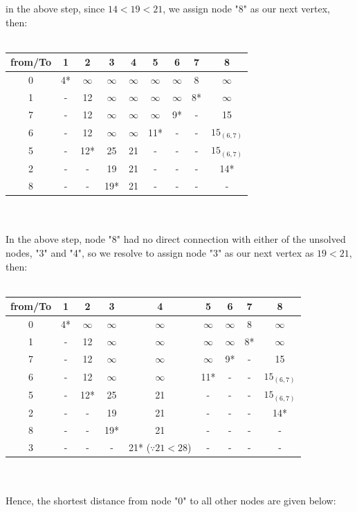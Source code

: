 in the above step, since $ 14 < 19 < 21 $, we assign node "8" as our next vertex, then:\\\\
\begin{tabular}{c | c| c| c| c| c| c| c| c}
	from/To & 1 & 2 & 3 & 4 & 5 & 6 & 7 & 8 \\
	\hline
	0 & 4* & $\infty$ & $\infty$& $\infty$& $\infty$& $\infty$ & 8 & $\infty$\\
	1 & - & 12 & $\infty$& $\infty$& $\infty$& $\infty$ & 8* & $\infty$\\
	7 & - & 12 & $\infty$& $\infty$& $\infty$& 9* & - & 15\\
	6 & - & 12 & $\infty$& $\infty$& 11* & - & - & $ 15_{(6, 7)}$ \\
	5 & - & 12* & 25 & 21 & - & - & - & $ 15_{(6, 7)}$ \\
	2 & - & - & 19 & 21 & - & - & - & 14*\\
	8 & - & - & 19* & 21 & - & - & - & -\\
\end{tabular}\\\\
In the above step, node "8" had no direct connection with either of the unsolved nodes, "3" and "4", so we resolve to assign node "3" as our next vertex as $ 19 < 21 $, then:\\\\
\begin{tabular}{c | c| c| c| c| c| c| c| c}
	from/To & 1 & 2 & 3 & 4 & 5 & 6 & 7 & 8 \\
	\hline
	0 & 4* & $\infty$ & $\infty$& $\infty$& $\infty$& $\infty$ & 8 & $\infty$\\
	1 & - & 12 & $\infty$& $\infty$& $\infty$& $\infty$ & 8* & $\infty$\\
	7 & - & 12 & $\infty$& $\infty$& $\infty$& 9* & - & 15\\
	6 & - & 12 & $\infty$& $\infty$& 11* & - & - & $ 15_{(6, 7)}$ \\
	5 & - & 12* & 25 & 21 & - & - & - & $ 15_{(6, 7)}$ \\
	2 & - & - & 19 & 21 & - & - & - & 14*\\
	8 & - & - & 19* & 21 & - & - & - & -\\
	3 & - & - & - & 21* ($\because 21 < 28$) & - & - & - & -\\
\end{tabular}\\\\
Hence, the shortest distance from node "0" to all other nodes are given below:\\\\
